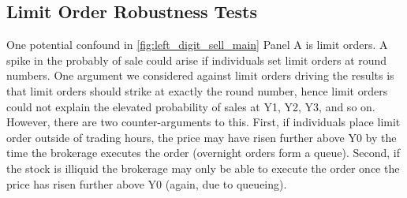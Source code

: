 \subsection{Limit Order Robustness Tests}

One potential confound in \ref{fig:left_digit_sell_main} Panel A is limit orders. A spike in the probably of sale could arise if individuals set limit orders at round numbers. One argument we considered against limit orders driving the results is that limit orders should strike at exactly the round number, hence limit orders could not explain the elevated probability of sales at Y1, Y2, Y3, and so on. However, there are two counter-arguments to this. First, if individuals place limit order outside of trading hours, the price may have risen further above Y0 by the time the brokerage executes the order (overnight orders form a queue). Second, if the stock is illiquid the brokerage may only be able to execute the order once the price has risen further above Y0 (again, due to queueing).

